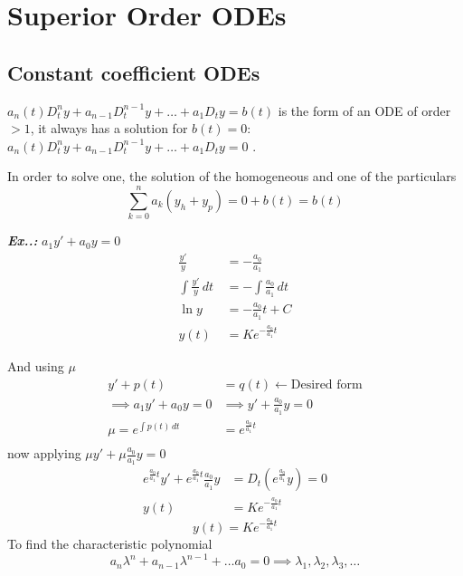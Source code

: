\documentclass[a4paper]{article}
\begin{document}
\section{Superior Order ODEs}
\setcounter{equation}{0}
\subsection{Constant coefficient ODEs}
\setcounter{equation}{0}
$a_{n}(t)D_{t}^{n}y+a_{n-1}D_{t}^{n-1}y+\dots+a_{1}D_{t}y=b(t)$ is the form of an ODE of order $>1$, it always has a solution for $b(t)=0$: $a_{n}(t)D_{t}^{n}y+a_{n-1}D_{t}^{n-1}y+\dots+a_{1}D_{t}y=\boxed{0}$ .

In order to solve one, the solution of the homogeneous and one of the particulars
$$
\sum^{n}_{k=0}a_{k}(y_{h}+y_{p})=0+b(t)=b(t)
$$
\vspace{1ex}\vspace{1ex}

\vspace{2ex}\textbf{\textit{Ex.\thesection.\theex: }}$a_{1}y'+a_{0}y=0$
\begin{align}
\frac{y'}{y}&=- \frac{a_{0}}{a_{1}} \\
\int \frac{y'}{y} \, dt\, &=-\int \frac{a_{0}}{a_{1}} \, dt\,  \\
\ln y &= -\frac{a_{0}}{a_{1}}t+C \\
y(t)&=Ke^{ -\frac{a_{0}}{a_{1}}t }
\end{align}

And using $\mu$
\begin{align}
y'+p(t)&=q(t) \leftarrow\text{Desired form} \\
\implies a_{1}y'+a_{0}y=0 &\implies y'+\frac{a_{0}}{a_{1}}y=0 \\
\mu=e^{ \int p(t) \, dt\,  }&=e^{ \frac{a_{0}}{a_{1}}t } \\
\end{align}
now applying $\mu y'+\mu \frac{a_{0}}{a_{1}}y=0$
\begin{align}
e^{ \frac{a_{0}}{a_{1}}t }y'+e^{ \frac{a_{0}}{a_{1}}t } \frac{a_{0}}{a_{1}}y &= D_{t}\left( e^{ \frac{a_{0}}{a_{1}} }y \right)=0 \\
y(t)&=Ke^{ - \frac{a_{0}}{a_{1}}t }
\end{align}
$$
\boxed{y(t)=Ke^{ -\frac{a_{0}}{a_{1}}t }}
$$
To find the characteristic polynomial
$$
a_{n}\lambda^{n}+a_{n-1}\lambda^{n-1}+\dots a_{0}=0\implies \lambda_{1},\lambda_{2},\lambda_{3},\dots
$$
\end{document}
